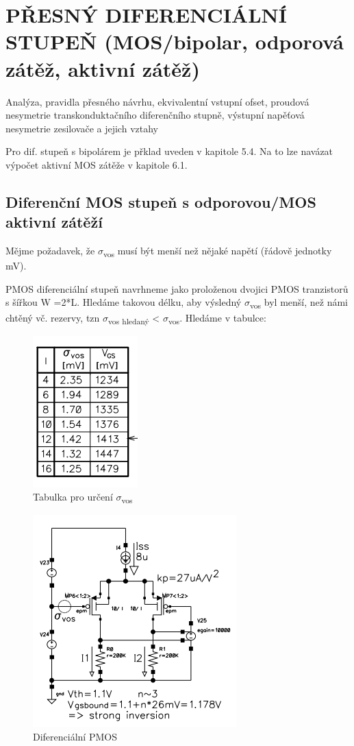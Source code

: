 \section{PŘESNÝ DIFERENCIÁLNÍ STUPEŇ (MOS/bipolar, odporová zátěž, aktivní zátěž)}
Analýza, pravidla přesného návrhu, ekvivalentní vstupní ofset, proudová nesymetrie transkonduktačního diferenčního stupně, výstupní napěťová nesymetrie zesilovače a jejich vztahy

Pro dif. stupeň s bipolárem je přklad uveden v kapitole 5.4. Na to lze navázat výpočet aktivní MOS zátěže v kapitole 6.1.

\subsection{Diferenční MOS stupeň s odporovou/MOS aktivní zátěží}
Mějme požadavek, že $\sigma$\textsubscript{vos} musí být menší než nějaké napětí (řádově jednotky mV).

PMOS diferenciální stupeň navrhneme jako proloženou dvojici PMOS tranzistorů s šířkou W =2*L. Hledáme takovou délku, aby výsledný $\sigma$\textsubscript{vos} byl menší, než námi chtěný vč. rezervy, tzn $\sigma$\textsubscript{vos hledaný} < $\sigma$\textsubscript{vos}. Hledáme v tabulce:
\begin{figure}[h]
   \begin{center}
     \includegraphics[scale=0.6]{images/tab.png}
   \end{center}
   \caption{Tabulka pro určení $\sigma$\textsubscript{vos}}
\end{figure}

\begin{figure}[h]
   \begin{center}
     \includegraphics[scale=0.6]{images/PMOS.png}
   \end{center}
   \caption{Diferenciální PMOS}
\end{figure}

